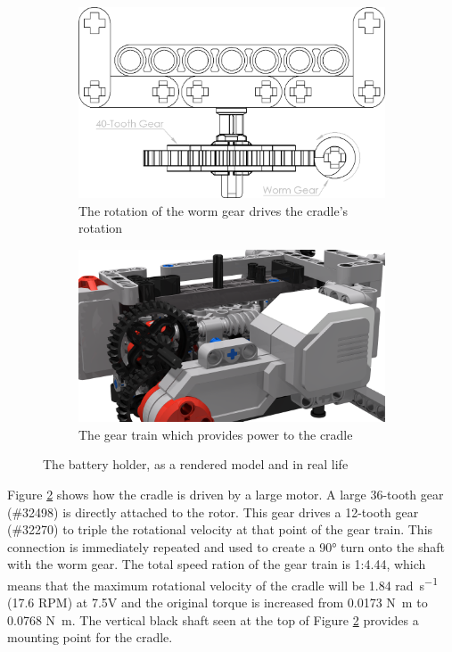 \documentclass{report}
\newcommand{\legopiece}[1]{(\##1)}
\begin{document}
	\begin{figure}[H]
		\centering
		\begin{subfigure}[b]{0.37999\textwidth}
			\includegraphics[width=\textwidth]{Resources/Images/dwgCradleWormGear.png}
			\caption{The rotation of the worm gear drives the cradle's rotation}
			\label{fig:dwgCradleWormGear}
		\end{subfigure}
		\hspace{10mm}
		\begin{subfigure}[b]{0.42014\textwidth}
			\includegraphics[width=\textwidth]{Resources/Images/rdrCradleWormGear.png}
			\caption{The gear train which provides power to the cradle}
			\label{fig:rdrCradleWormGear}
		\end{subfigure}
		\caption{The battery holder, as a rendered model and in real life}
		\label{fig:cradleWormGear}
	\end{figure}
	
	Figure \ref{fig:rdrCradleWormGear} shows how the cradle is driven by a large motor. A large 36-tooth gear \legopiece{32498} is directly attached to the rotor. This gear drives a 12-tooth gear \legopiece{32270} to triple the rotational velocity at that point of the gear train. This connection is immediately repeated and used to create a \ang{90} turn onto the shaft with the worm gear. The total speed ration of the gear train is 1:4.44, which means that the maximum rotational velocity of the cradle will be 1.84 \si{\radian\per\second} (17.6 RPM) at 7.5\si{\volt} and the original torque is increased from 0.0173 \si{\newton\metre} to 0.0768 \si{\newton\metre}. The vertical black shaft seen at the top of Figure \ref{fig:rdrCradleWormGear} provides a mounting point for the cradle.
	
\end{document}
